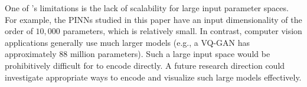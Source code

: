 \documentclass[letterpaper]{article} %
\begin{document}
                One of \proposedautencoder{}'s limitations is the lack of scalability for large input parameter spaces. For example, the PINNs studied in this paper have an input dimensionality of the order of $10,000$ parameters, which is relatively small. In contrast, computer vision applications generally use much larger models (e.g., a VQ-GAN \cite{esser2021taming} has approximately $88$ million parameters).
                Such a large input space would be prohibitively difficult for \proposedautencoder{} to encode directly. A future research direction could investigate appropriate ways to encode and visualize such large models effectively. 
\end{document}
